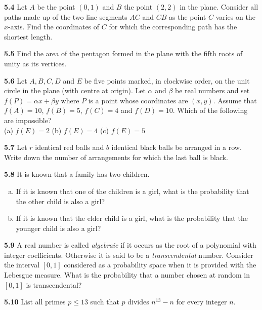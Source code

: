 \documentclass[11pt,a4paper]{article}
\newcommand{\qitem}[1]{\par\medskip\noindent\textbf{#1}\hspace{0.5em}}
\begin{document}
\qitem{5.4} Let $A$ be the point $(0, 1)$ and $B$ the point $(2, 2)$ in the plane. Consider all paths made up of the two line segments $AC$ and $CB$ as the point $C$ varies on the $x$-axis. Find the coordinates of $C$ for which the corresponding path has the shortest length.

\qitem{5.5} Find the area of the pentagon formed in the plane with the fifth roots of unity as its vertices.

\qitem{5.6} Let $A, B, C, D$ and $E$ be five points marked, in clockwise order, on the unit circle in the plane (with centre at origin). Let $\alpha$ and $\beta$ be real numbers and set $f(P) = \alpha x + \beta y$ where $P$ is a point whose coordinates are $(x, y)$. Assume that $f(A) = 10$, $f(B) = 5$, $f(C) = 4$ and $f(D) = 10$. Which of the following are impossible?\\
(a) $f(E) = 2$ \qquad (b) $f(E) = 4$ \qquad (c) $f(E) = 5$

\qitem{5.7} Let $r$ identical red balls and $b$ identical black balls be arranged in a row. Write down the number of arrangements for which the last ball is black.

\qitem{5.8} It is known that a family has two children.
\begin{enumerate}[(a)]
  \item If it is known that one of the children is a girl, what is the probability that the other child is also a girl?
  \item If it is known that the elder child is a girl, what is the probability that the younger child is also a girl?
\end{enumerate}

\qitem{5.9} A real number is called \emph{algebraic} if it occurs as the root of a polynomial with integer coefficients. Otherwise it is said to be a \emph{transcendental} number. Consider the interval $[0, 1]$ considered as a probability space when it is provided with the Lebesgue measure. What is the probability that a number chosen at random in $[0, 1]$ is transcendental?

\qitem{5.10} List all primes $p \le 13$ such that $p$ divides $n^{13} - n$ for every integer $n$.
\end{document}
